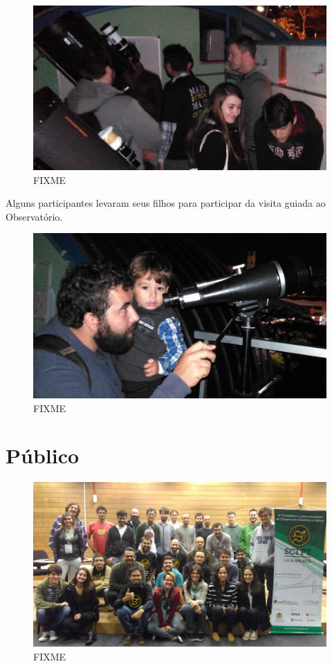 \documentclass[12pt]{article}
\begin{document}
\begin{figure}[!htb]
\center
\includegraphics[height=.3\textheight]{social-astro.jpg}
\caption{FIXME}
\end{figure}

Alguns participantes levaram seus filhos para participar da visita guiada ao
Observatório.

\begin{figure}[!htb]
\center
\includegraphics[height=.3\textheight]{social-family.jpg}
\caption{FIXME}
\end{figure}

\newpage

\section*{Público}

\begin{figure}[!htb]
\center
\includegraphics[height=.3\textheight]{group.jpg}
\caption{FIXME}
\end{figure}
\end{document}
